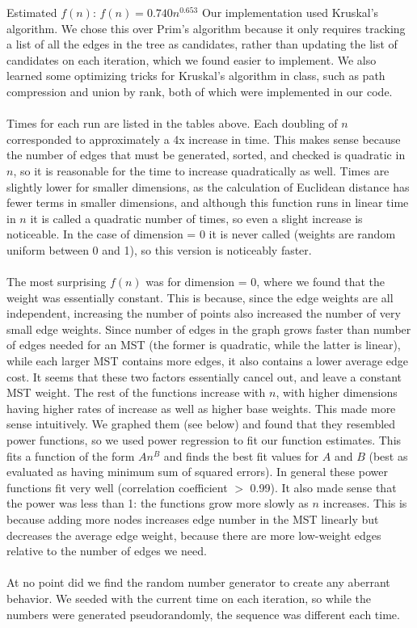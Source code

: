 \documentclass[11pt]{article}
\begin{document}
	Estimated $f(n)$: $f(n) = 0.740n^{0.653}$
\newpage	
\noindent Our implementation used Kruskal's algorithm. We chose this over Prim's algorithm because it only requires tracking a list of all the edges in the tree as candidates, rather than updating the list of candidates on each iteration, which we found easier to implement. We also learned some optimizing tricks for Kruskal's algorithm in class, such as path compression and union by rank, both of which were implemented in our code.\\
\\
Times for each run are listed in the tables above. Each doubling of $n$ corresponded to approximately a 4x increase in time. This makes sense because the number of edges that must be generated, sorted, and checked is quadratic in $n$, so it is reasonable for the time to increase quadratically as well. Times are slightly lower for smaller dimensions, as the calculation of Euclidean distance has fewer terms in smaller dimensions, and although this function runs in linear time in $n$ it is called a quadratic number of times, so even a slight increase is noticeable. In the case of dimension = 0 it is never called (weights are random uniform between 0 and 1), so this version is noticeably faster.\\
\\
The most surprising $f(n)$ was for dimension = 0, where we found that the weight was essentially constant. This is because, since the edge weights are all independent, increasing the number of points also increased the number of very small edge weights. Since number of edges in the graph grows faster than number of edges needed for an MST (the former is quadratic, while the latter is linear), while each larger MST contains more edges, it also contains a lower average edge cost. It seems that these two factors essentially cancel out, and leave a constant MST weight. The rest of the functions increase with $n$, with higher dimensions having higher rates of increase as well as higher base weights. This made more sense intuitively. We graphed them (see below) and found that they resembled power functions, so we used power regression to fit our function estimates. This fits a function of the form $An^B$ and finds the best fit values for $A$ and $B$ (best as evaluated as having minimum sum of squared errors). In general these power functions fit very well (correlation coefficient $>$ 0.99). It also made sense that the power was less than 1: the functions grow more slowly as $n$ increases. This is because adding more nodes increases edge number in the MST linearly but decreases the average edge weight, because there are more low-weight edges relative to the number of edges we need.
\\
\\
At no point did we find the random number generator to create any aberrant behavior. We seeded with the current time on each iteration, so while the numbers were generated pseudorandomly, the sequence was different each time.
\newpage
\end{document}
